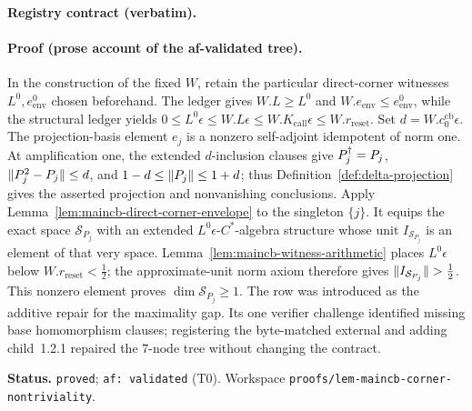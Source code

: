 \noindent\textbf{Registry contract (verbatim).}

\paragraph{Proof (prose account of the af-validated tree).}
In the construction of the fixed $W$, retain the particular direct-corner witnesses $L^0,e^0_{\mathrm{env}}$
chosen beforehand.  The ledger gives $W.L\geq L^0$ and $W.e_{\mathrm{env}}\leq e^0_{\mathrm{env}}$,
while the structural ledger yields
$0\leq L^0\epsilon\leq W.L\epsilon\leq W.K_{\mathrm{call}}\epsilon\leq W.r_{\mathrm{reset}}$.
Set $d=W.c^{\mathrm{cb}}_0\epsilon$.  The projection-basis element $e_j$ is a nonzero self-adjoint
idempotent of norm one.  At amplification one, the extended $d$-inclusion clauses give
$P_j^{\dagger}=P_j$, $\lVert P_j^2-P_j\rVert\leq d$, and $1-d\leq\lVert P_j\rVert\leq1+d$; thus
Definition~\ref{def:delta-projection} gives the asserted projection and nonvanishing conclusions.
Apply Lemma~\ref{lem:maincb-direct-corner-envelope} to the singleton $\{j\}$.  It equips the exact
space $\mathcal S_{P_j}$ with an extended $L^0\epsilon$-$C^*$-algebra structure whose unit
$I_{\mathcal S_{P_j}}$ is an element of that very space.  Lemma~\ref{lem:maincb-witness-arithmetic}
places $L^0\epsilon$ below $W.r_{\mathrm{reset}}<\tfrac12$; the approximate-unit norm axiom therefore
gives $\lVert I_{\mathcal S_{P_j}}\rVert>\tfrac12$.  This nonzero element proves
$\dim\mathcal S_{P_j}\geq1$.  The row was introduced as the additive repair for the maximality gap.
Its one verifier challenge identified missing base homomorphism clauses; registering the byte-matched
external and adding child~1.2.1 repaired the $7$-node tree without changing the contract.

\medskip\noindent\textbf{Status.} \texttt{proved}; \texttt{af: validated} (T0).  Workspace
\texttt{proofs/lem-maincb-corner-nontriviality}.
